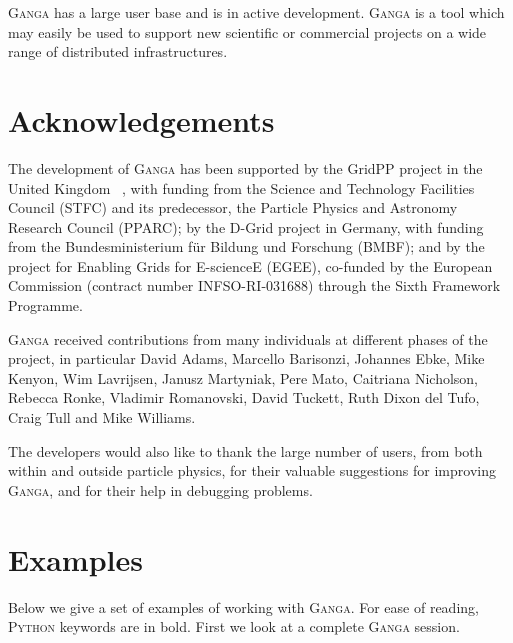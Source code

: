 \documentclass{elsart}
\def\ganga {\textsc{Ganga}\xspace}
\def\python {\textsc{Python}\xspace}
\begin{document}
\ganga has a large user base and is in active development. \ganga is a tool which may easily
be used to support new scientific or commercial projects on a wide range of distributed
infrastructures.

\section{Acknowledgements}
\label{sec:acknowledgements}
The development of \ganga has been supported by the GridPP project in the
United Kingdom ~\cite{Faulkner:2006px}, with funding from the Science and Technology
Facilities Council (STFC) and its predecessor, the Particle Physics and
Astronomy Research Council (PPARC); by the D-Grid project in Germany,
with funding from the Bundesministerium f\"ur Bildung und Forschung
(BMBF); and by the project for Enabling Grids for E-scienceE (EGEE),   
co-funded by the European Commission (contract number INFSO-RI-031688) through the Sixth
Framework Programme.

\ganga received contributions from many individuals at different
phases of the project, in particular David Adams, Marcello Barisonzi, Johannes Ebke, 
Mike Kenyon, Wim Lavrijsen, Janusz Martyniak, Pere Mato, Caitriana Nicholson, 
Rebecca Ronke, Vladimir Romanovski, David Tuckett, Ruth Dixon del Tufo, 
Craig Tull and Mike Williams.

The developers would also like to thank the large number of users, from both
within and outside particle physics, for their valuable suggestions for
improving \ganga, and for their help in debugging problems.


\appendix

\section{Examples}
\label{sec:examples}
Below we give a set of examples of working with \ganga. For ease of reading,
\python keywords are in bold. First we look at a complete \ganga session.
\vspace{-2ex}
\end{document}
